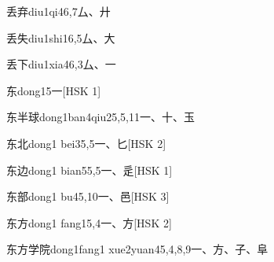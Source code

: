 \begin{EntryWithPhonetic}{丢弃}{diu1qi4}{6,7}{⼛、⼶}
\end{EntryWithPhonetic}

\begin{EntryWithPhonetic}{丢失}{diu1shi1}{6,5}{⼛、⼤}
\end{EntryWithPhonetic}

\begin{EntryWithPhonetic}{丢下}{diu1xia4}{6,3}{⼛、⼀}
\end{EntryWithPhonetic}

\begin{EntryWithPhonetic}{东}{dong1}{5}{⼀}[HSK 1]
\end{EntryWithPhonetic}

\begin{EntryWithPhonetic}{东半球}{dong1ban4qiu2}{5,5,11}{⼀、⼗、⽟}
\end{EntryWithPhonetic}

\begin{EntryWithPhonetic}{东北}{dong1 bei3}{5,5}{⼀、⼔}[HSK 2]
\end{EntryWithPhonetic}

\begin{EntryWithPhonetic}{东边}{dong1 bian5}{5,5}{⼀、⾡}[HSK 1]
\end{EntryWithPhonetic}

\begin{EntryWithPhonetic}{东部}{dong1 bu4}{5,10}{⼀、⾢}[HSK 3]
\end{EntryWithPhonetic}

\begin{EntryWithPhonetic}{东方}{dong1 fang1}{5,4}{⼀、⽅}[HSK 2]
\end{EntryWithPhonetic}

\begin{EntryWithPhonetic}{东方学院}{dong1fang1 xue2yuan4}{5,4,8,9}{⼀、⽅、⼦、⾩}
\end{EntryWithPhonetic}

